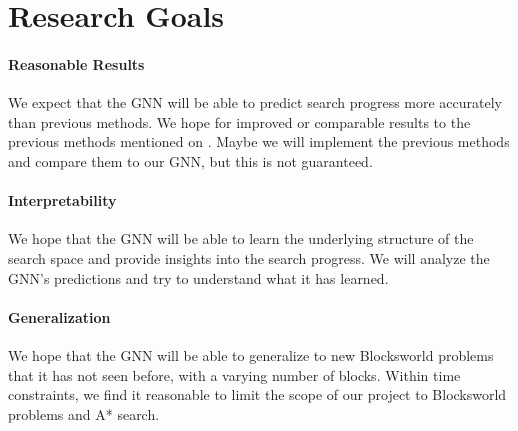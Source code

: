 \documentclass[11pt]{article}
\begin{document}
\section{Research Goals}

\paragraph{Reasonable Results} We expect that the GNN will be able to predict search progress more accurately than previous methods. We hope for improved or comparable results to the previous methods mentioned on \citet{sudry2022learning}. Maybe we will implement the previous methods and compare them to our GNN, but this is not guaranteed.

\paragraph{Interpretability} We hope that the GNN will be able to learn the underlying structure of the search space and provide insights into the search progress. We will analyze the GNN's predictions and try to understand what it has learned.

\paragraph{Generalization} We hope that the GNN will be able to generalize to new Blocksworld problems that it has not seen before, with a varying number of blocks. Within time constraints, we find it reasonable to limit the scope of our project to Blocksworld problems and A* search. 


\end{document}
